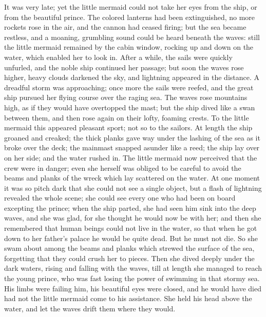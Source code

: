 It was very late; yet the little mermaid could not take her eyes
from the ship, or from the beautiful prince. 
The colored lanterns
had been extinguished, no more rockets rose in the air, and the cannon
had ceased firing; but the sea became restless, and a moaning,
grumbling sound could be heard beneath the waves: still the little
mermaid remained by the cabin window, rocking up and down on the
water, which enabled her to look in. 
After a while, the sails were
quickly unfurled, and the noble ship continued her passage; but soon
the waves rose higher, heavy clouds darkened the sky, and lightning
appeared in the distance. 
A dreadful storm was approaching; once
more the sails were reefed, and the great ship pursued her flying
course over the raging sea. 
The waves rose mountains high, as if
they would have overtopped the mast; but the ship dived like a swan
between them, and then rose again on their lofty, foaming crests. 
To
the little mermaid this appeared pleasant sport; not so to the
sailors. 
At length the ship groaned and creaked; the thick planks gave
way under the lashing of the sea as it broke over the deck; the
mainmast snapped asunder like a reed; the ship lay over on her side;
and the water rushed in. 
The little mermaid now perceived that the
crew were in danger; even she herself was obliged to be careful to
avoid the beams and planks of the wreck which lay scattered on the
water. 
At one moment it was so pitch dark that she could not see a
single object, but a flash of lightning revealed the whole scene;
she could see every one who had been on board excepting the prince;
when the ship parted, she had seen him sink into the deep waves, and
she was glad, for she thought he would now be with her; and then she
remembered that human beings could not live in the water, so that when
he got down to her father's palace he would be quite dead. 
But he must
not die. 
So she swam about among the beams and planks which strewed
the surface of the sea, forgetting that they could crush her to
pieces. 
Then she dived deeply under the dark waters, rising and
falling with the waves, till at length she managed to reach the
young prince, who was fast losing the power of swimming in that stormy
sea. 
His limbs were failing him, his beautiful eyes were closed, and
he would have died had not the little mermaid come to his
assistance. 
She held his head above the water, and let the waves drift
them where they would.

